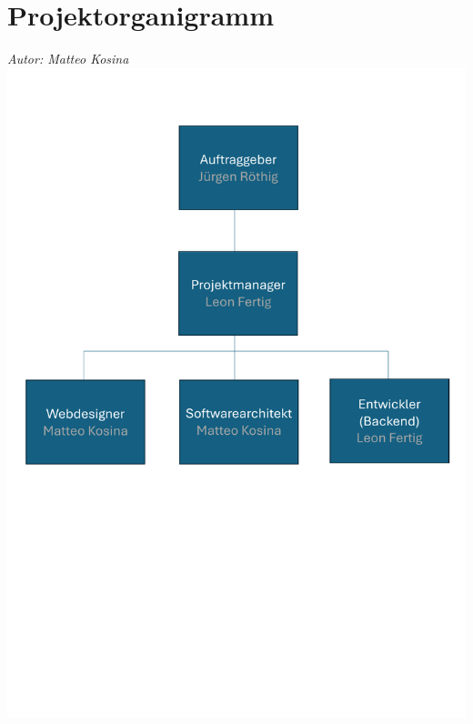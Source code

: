 \documentclass[12pt]{article}
\begin{document}
\section{Projektorganigramm}
{\it Autor: Matteo Kosina}
\newline
\includegraphics[width=\textwidth]{Planungsdokumente/graphics/Projektorganigramm.pdf}
\end{document}
